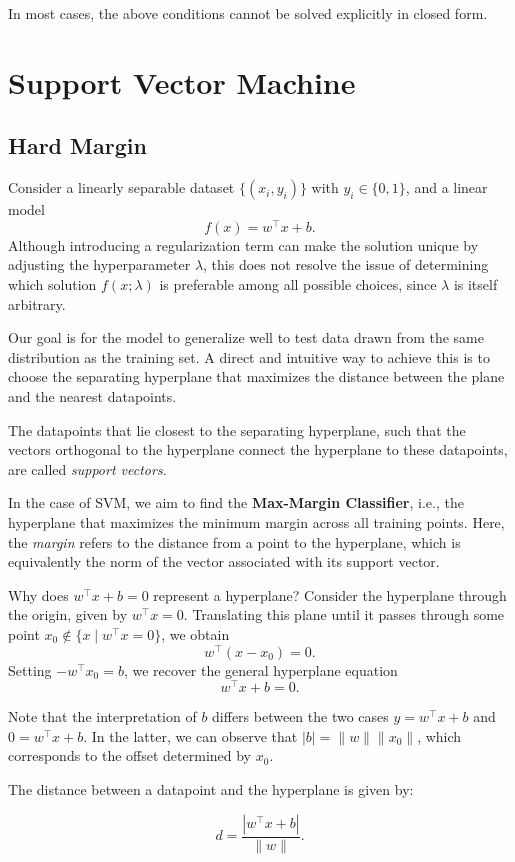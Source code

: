 \documentclass[../main]{subfiles}
\begin{document}
In most cases, the above conditions cannot be solved explicitly in closed form.  

\section{Support Vector Machine}
\subsection{Hard Margin}
Consider a linearly separable dataset $\{(x_i, y_i)\}$ with $y_i \in \{0,1\}$, and a linear model
\begin{equation}
    f(x) = w^\top x + b.
\end{equation}
Although introducing a regularization term can make the solution unique by adjusting the hyperparameter $\lambda$, this does not resolve the issue of determining which solution $f(x;\lambda)$ is preferable among all possible choices, since $\lambda$ is itself arbitrary.

Our goal is for the model to generalize well to test data drawn from the same distribution as the training set.  
A direct and intuitive way to achieve this is to choose the separating hyperplane that maximizes the distance between the plane and the nearest datapoints.

\begin{definition}
    The datapoints that lie closest to the separating hyperplane, such that the vectors orthogonal to the hyperplane connect the hyperplane to these datapoints, are called \emph{support vectors}.
\end{definition}
In the case of SVM, we aim to find the \textbf{Max-Margin Classifier}, i.e., the hyperplane that maximizes the minimum margin across all training points.  
Here, the \emph{margin} refers to the distance from a point to the hyperplane, which is equivalently the norm of the vector associated with its support vector.

\begin{remark}
    Why does $w^\top x + b = 0$ represent a hyperplane?  
    Consider the hyperplane through the origin, given by $w^\top x = 0$.  
    Translating this plane until it passes through some point $x_0 \notin \{x \mid w^\top x = 0\}$, we obtain
    \[
        w^\top (x - x_0) = 0.
    \]
    Setting $-w^\top x_0 = b$, we recover the general hyperplane equation
    \[
        w^\top x + b = 0.
    \]
\end{remark}

\begin{remark}
    Note that the interpretation of $b$ differs between the two cases $y = w^\top x + b$ and $0 = w^\top x + b$.  
    In the latter, we can observe that $|b| = \|w\| \|x_0\|$, which corresponds to the offset determined by $x_0$.
\end{remark}
The distance between a datapoint and the hyperplane is given by:
\begin{theorem}
    \begin{equation}
        d = \frac{|w^\top x + b|}{\|w\|}. \label{3.15}
    \end{equation}
\end{theorem}
\end{document}
